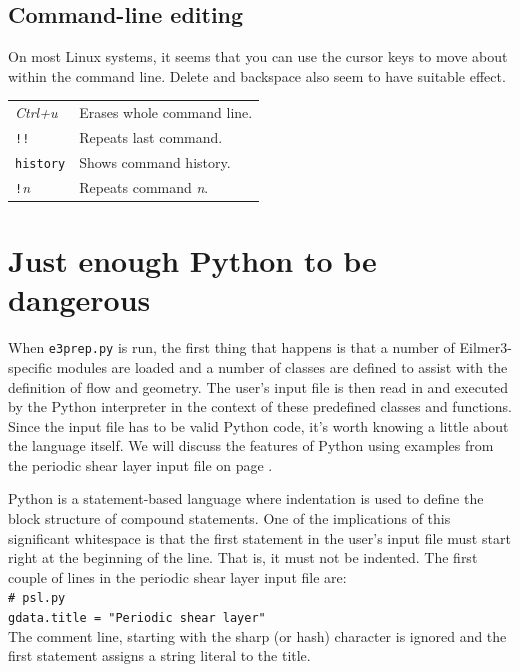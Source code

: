 \documentclass[12pt,a4paper,twoside]{article}
\begin{document}
\subsection*{Command-line editing}
On most Linux systems, it seems that you can use the cursor keys to move about within the command line.
Delete and backspace also seem to have suitable effect.

\smallskip \noindent
\begin{tabular}{l|l}
 \textit{Ctrl+u} & Erases whole command line. \\
 \texttt{!!} & Repeats last command. \\
 \texttt{history} & Shows command history. \\
 \texttt{!}\textit{n} & Repeats command \textit{n}. \\
\end{tabular}


\cleardoublepage
\section{Just enough Python to be dangerous}
\label{python-notes-sec}
When \texttt{e3prep.py} is run, the first thing that happens is that a number of Eilmer3-specific
modules are loaded and a number of classes are defined to assist with the definition of flow and geometry.
The user's input file is then read in and executed by the Python interpreter
in the context of these predefined classes and functions.
Since the input file has to be valid Python code, it's worth knowing a little about the language itself.
We will discuss the features of Python using examples from the periodic shear layer input file on
page \pageref{psl-py-file}.

\medskip
Python is a statement-based language where indentation is used to define the block structure
of compound statements.
One of the implications of this significant whitespace is that the first statement in the user's input
file must start right at the beginning of the line.
That is, it must not be indented.
The first couple of lines in the periodic shear layer input file are:\\
\texttt{\# psl.py\\
gdata.title = "Periodic shear layer"\\
}
The comment line, starting with the sharp (or hash) character is ignored and the first statement assigns
a string literal to the title.
\end{document}
